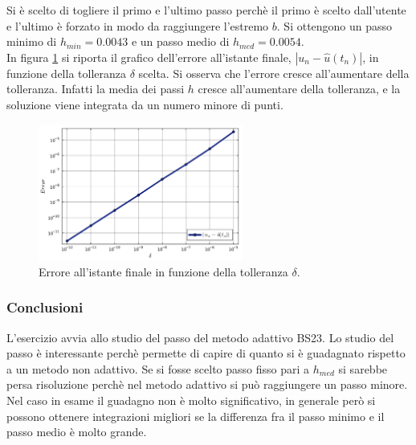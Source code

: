 \documentclass[letterpaper, 12pt]{article}
\numberwithin{equation}{section}    %
\begin{document}
Si è scelto di togliere il primo e l'ultimo passo perchè il primo è scelto dall'utente e l'ultimo
è forzato in modo da raggiungere l'estremo $b$. Si ottengono
un passo minimo di $h_{min} = 0.0043$ e un passo medio di $h_{med} = 0.0054$. \\
In figura \ref{fig:es6_3_5_2} si riporta il grafico dell'errore all'istante finale,
$|u_n-\hat{u}(t_n)|$, in funzione della tolleranza $\delta$ scelta. Si osserva che l'errore cresce all'aumentare
della tolleranza. Infatti la media dei passi $h$ cresce all'aumentare della tolleranza, e la soluzione 
viene integrata da un numero minore di punti.
\begin{figure}[!ht]
    \centering
    \includegraphics[width=0.6\textwidth]{6353.pdf}
    \caption{Errore all'istante finale in funzione della tolleranza $\delta$.}
    \label{fig:es6_3_5_2}
\end{figure}

\subsubsection{Conclusioni}
L'esercizio avvia allo studio del passo del metodo adattivo BS23. Lo studio del passo è interessante
perchè permette di capire di quanto si è guadagnato rispetto a un metodo non adattivo. Se si fosse
scelto passo fisso pari a $h_{med}$ si sarebbe persa risoluzione perchè nel metodo adattivo
si può raggiungere un passo minore. Nel caso in esame il guadagno non è molto significativo, in generale però
si possono ottenere integrazioni migliori se la differenza fra il passo minimo e il passo medio è molto grande. \\
\end{document}
